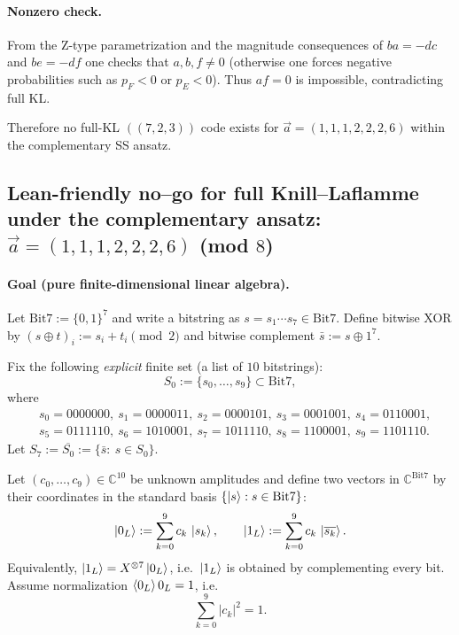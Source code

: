 \documentclass[11pt]{article}
\newcommand{\Bit}{\mathrm{Bit}}
\begin{document}
\paragraph{Nonzero check.}
From the Z-type parametrization and the magnitude consequences of $ba=-dc$ and $be=-df$ one checks
that $a,b,f\neq 0$ (otherwise one forces negative probabilities such as $p_F<0$ or $p_E<0$).
Thus $af=0$ is impossible, contradicting full KL.

Therefore no full-KL \(((7,2,3))\) code exists for $\vec a=(1,1,1,2,2,2,6)$ within the complementary SS ansatz.

\subsection{Lean-friendly no--go for full Knill--Laflamme under the complementary ansatz:
$\vec a=(1,1,1,2,2,2,6)$ (mod $8$)}
\label{subsec:lean-nogo-1112226}

\paragraph{Goal (pure finite-dimensional linear algebra).}
Let $\Bit7:=\{0,1\}^7$ and write a bitstring as $s=s_1\cdots s_7\in\Bit7$.
Define bitwise XOR by $(s\oplus t)_i := s_i+t_i \pmod 2$ and bitwise complement $\bar s:=s\oplus 1^7$.

Fix the following \emph{explicit} finite set (a list of $10$ bitstrings):
\[
S_0:=\{s_0,\dots,s_9\}\subset\Bit7,
\]
where
\[
\begin{aligned}
&s_0=0000000,\ s_1=0000011,\ s_2=0000101,\ s_3=0001001,\ s_4=0110001,\\
&s_5=0111110,\ s_6=1010001,\ s_7=1011110,\ s_8=1100001,\ s_9=1101110.
\end{aligned}
\]
Let $S_7:=\overline{S_0}:=\{\bar s:\ s\in S_0\}$.

Let $(c_0,\dots,c_9)\in\mathbb C^{10}$ be unknown amplitudes and define two vectors in
$\mathbb C^{\Bit7}$ by their coordinates in the standard basis $\{\ket{s}:s\in\Bit7\}$:
\begin{equation}
\ket{0_L}:=\sum_{k=0}^9 c_k\,\ket{s_k},
\qquad
\ket{1_L}:=\sum_{k=0}^9 c_k\,\ket{\overline{s_k}}.
\label{eq:lean-def-01}
\end{equation}
Equivalently, $\ket{1_L}=X^{\otimes 7}\ket{0_L}$, i.e.\ $\ket{1_L}$ is obtained by complementing every bit.
Assume normalization $\braket{0_L}{0_L}=1$, i.e.
\begin{equation}
\sum_{k=0}^9 |c_k|^2=1.
\label{eq:lean-normalization}
\end{equation}
\end{document}
